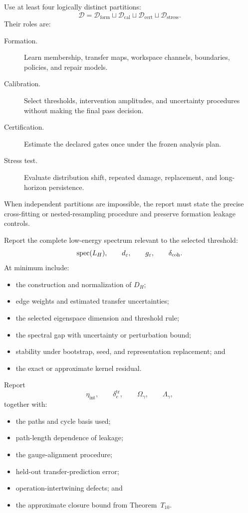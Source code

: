 
Use at least four logically distinct partitions:
\[
\boxed{
\mathcal D
=
\mathcal D_{\mathrm{form}}
\sqcup
\mathcal D_{\mathrm{cal}}
\sqcup
\mathcal D_{\mathrm{cert}}
\sqcup
\mathcal D_{\mathrm{stress}}.
}
\]
Their roles are:
\begin{description}
\item[Formation.] Learn membership, transfer maps, workspace channels,
 boundaries, policies, and repair models.
\item[Calibration.] Select thresholds, intervention amplitudes, and
 uncertainty procedures without making the final pass decision.
\item[Certification.] Estimate the declared gates once under the frozen
 analysis plan.
\item[Stress test.] Evaluate distribution shift, repeated damage, replacement,
 and long-horizon persistence.
\end{description}
When independent partitions are impossible, the report must state the precise
cross-fitting or nested-resampling procedure and preserve formation leakage
controls.


Report the complete low-energy spectrum relevant to the selected threshold:
\[
\operatorname{spec}(L_H),
\qquad
 d_\varepsilon,
\qquad
 g_\varepsilon,
\qquad
 \delta_{\mathrm{coh}}.
\]
At minimum include:
\begin{itemize}
\item the construction and normalization of \(D_H\);
\item edge weights and estimated transfer uncertainties;
\item the selected eigenspace dimension and threshold rule;
\item the spectral gap with uncertainty or perturbation bound;
\item stability under bootstrap, seed, and representation replacement; and
\item the exact or approximate kernel residual.
\end{itemize}


Report
\[
\eta_{\mathrm{int}},
\qquad
\delta_e^{\mathrm{tr}},
\qquad
\Omega_\gamma,
\qquad
\Lambda_\gamma,
\]
together with:
\begin{itemize}
\item the paths and cycle basis used;
\item path-length dependence of leakage;
\item the gauge-alignment procedure;
\item held-out transfer-prediction error;
\item operation-intertwining defects; and
\item the approximate closure bound from Theorem~\(T_{10}\).
\end{itemize}

